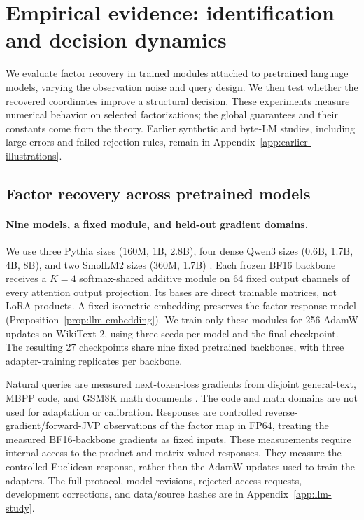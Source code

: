 \section{Empirical evidence: identification and decision dynamics}
\label{sec:experiments}

We evaluate factor recovery in trained modules attached to pretrained
language models, varying the observation noise and query design. We then
test whether the recovered coordinates improve a structural decision.
These experiments measure numerical behavior on selected factorizations;
the global guarantees and their constants come from the theory. Earlier synthetic and byte-LM studies,
including large errors and failed rejection rules, remain in
Appendix~\ref{app:earlier-illustrations}.

\subsection{Factor recovery across pretrained models}

\paragraph{Nine models, a fixed module, and held-out gradient domains.}
We use three Pythia sizes (160M, 1B, 2.8B), four dense Qwen3 sizes
(0.6B, 1.7B, 4B, 8B), and two SmolLM2 sizes (360M, 1.7B)
\citep{biderman2023pythia,yang2025qwen3,allal2025smollm2}.
Each frozen BF16 backbone receives a $K=4$ softmax-shared additive module
on 64 fixed output channels of every attention output projection. Its bases
are direct trainable matrices, not LoRA products. A fixed isometric
embedding preserves the factor-response model
(Proposition~\ref{prop:llm-embedding}). We train only these modules for
256 AdamW updates on WikiText-2, using three seeds per model and the final
checkpoint. The resulting 27 checkpoints share nine fixed pretrained backbones, with
three adapter-training replicates per backbone.

Natural queries are measured next-token-loss gradients from disjoint
 general-text, MBPP code, and GSM8K math documents
\citep{merity2016wikitext,austin2021mbpp,cobbe2021gsm8k}.
The code and math domains are not used for adaptation or calibration.
Responses are controlled reverse-gradient/forward-JVP observations of the
factor map in FP64, treating the measured BF16-backbone gradients as fixed
inputs. These measurements require internal access to the product and
matrix-valued responses. They measure the controlled Euclidean response,
rather than the AdamW updates used to train the adapters.
The full protocol, model revisions, rejected access requests, development
corrections, and data/source hashes are in Appendix~\ref{app:llm-study}.

